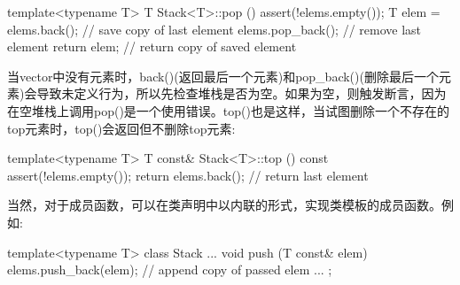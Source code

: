 \begin{cpp}
template<typename T>
T Stack<T>::pop ()
{
	assert(!elems.empty());
	T elem = elems.back(); // save copy of last element
	elems.pop_back(); // remove last element
	return elem; // return copy of saved element
}
\end{cpp}

当vector中没有元素时，back()(返回最后一个元素)和pop\_back()(删除最后一个元素)会导致未定义行为，所以先检查堆栈是否为空。如果为空，则触发断言，因为在空堆栈上调用pop()是一个使用错误。top()也是这样，当试图删除一个不存在的top元素时，top()会返回但不删除top元素:

\begin{cpp}
template<typename T>
T const& Stack<T>::top () const
{
	assert(!elems.empty());
	return elems.back(); // return last element
}
\end{cpp}

当然，对于成员函数，可以在类声明中以内联的形式，实现类模板的成员函数。例如:

\begin{cpp}
template<typename T>
class Stack {
	...
	void push (T const& elem) {
		elems.push_back(elem); // append copy of passed elem
	}
	...
};
\end{cpp}






